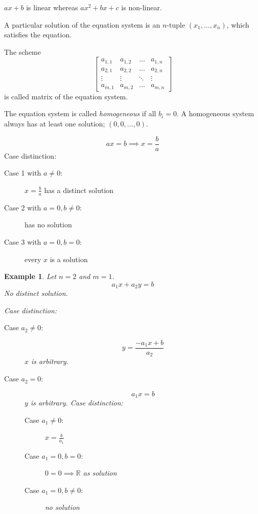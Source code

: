 \documentclass[a4paper,landscape,twocolumn]{article}
\newtheorem{ex}{Example}[section]
\begin{document}
$ax+b$ is linear whereas $ax^2 + bx + c$ is non-linear.

A particular solution of the equation system is an $n$-tuple $(x_1, \ldots, x_n)$,
which satisfies the equation.

The scheme
\begin{displaymath}
  \begin{bmatrix}
    a_{1,1} & a_{1,2} & \ldots & a_{1,n} \\
    a_{2,1} & a_{2,2} & \ldots & a_{2,n} \\
    \vdots  & \vdots  & \ddots & \vdots \\
    a_{m,1} & a_{m,2} & \ldots & a_{m,n}
  \end{bmatrix}
\end{displaymath}
is called matrix of the equation system.

The equation system is called \emph{homogeneous} if all $b_i = 0$.
A homogeneous system always has at least one solution; $(0, 0, \ldots, 0)$.

\[ ax = b \implies x = \frac ba \]
Case distinction:
\begin{description}
  \item[Case 1 with $a \neq 0$:]
    $x = \frac ba$ has a distinct solution
  \item[Case 2 with $a = 0, b \neq 0$:]
    has no solution
  \item[Case 3 with $a = 0, b = 0$:]
    every $x$ is a solution
\end{description}

\begin{ex}
Let $n = 2$ and $m=1$.
\[ a_1 x + a_2 y = b \]
No distinct solution.

Case distinction:
\begin{description}
  \item[Case $a_2 \neq 0$:]
    \[ y = \frac{-a_1 x + b}{a_2} \]
    $x$ is arbitrary.
  \item[Case $a_2 = 0$:]
    \[ a_1 x = b \]
    $y$ is arbitrary. Case distinction:
    \begin{description}
      \item[Case $a_1 \neq 0$:] $x = \frac{b}{a_1}$
      \item[Case $a_1 = 0, b = 0$:] $0 = 0 \implies \mathbb{R}$ as solution
      \item[Case $a_1 = 0, b \neq 0$:] no solution
    \end{description}
\end{description}
\end{ex}
\end{document}
